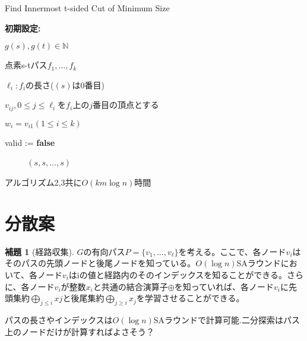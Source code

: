 \documentclass{jarticle}
\theoremstyle{definition}
\newtheorem{lemma}{補題}
\begin{document}
\begin{algorithm}[H]
  \caption{Find Innermost t-sided Cut of Minimum Size} 
  \textbf{初期設定:} \par
  $g(s),g(t)\in \mathbb{N}$ \par
  点素s-tパス$f_1,...,f_k$ \par
  $\ell_i:f_i$の長さ($(s)$は0番目) \par
  $v_{ij},0 \leq j \leq \ell_i$を$f_i$上の$j$番目の頂点とする \par
  $w_i=v_{i1}(1\leq i \leq k)$ \par
  valid := \textbf{false} \par 
  {\setlength{\baselineskip}{10pt}
  \begin{algorithmic}[1]
       
       
           
           
          \Else
          \EndIf　
          \EndWhile　
    \EndFor
    \Else
     $(s,s,...,s)$
    \EndIf
  \end{algorithmic}
  }
\end{algorithm}

アルゴリズム2,3共に$O(km\log n)$時間

\section*{分散案}

\begin{lemma}[経路収集]
  $G$の有向パス$P = \{v_1,...,v_\ell\}$を考える。ここで、各ノード$v_i$はそのパスの先頭ノードと後尾ノードを知っている。$O(\log n)$SAラウンドにおいて、各ノード$v_i$はiの値と経路内のそのインデックスを知ることができる。さらに、各ノード$v_i$が整数$x_i$と共通の結合演算子$\oplus$を知っていれば、各ノード$v_i$に先頭集約$\bigoplus_{j\leq i}xj$と後尾集約$\bigoplus_{j\geq i}x_j$を学習させることができる。
\end{lemma}
パスの長さやインデックスは$O(\log n)$SAラウンドで計算可能.二分探索はパス上のノードだけが計算すればよさそう？
\end{document}
